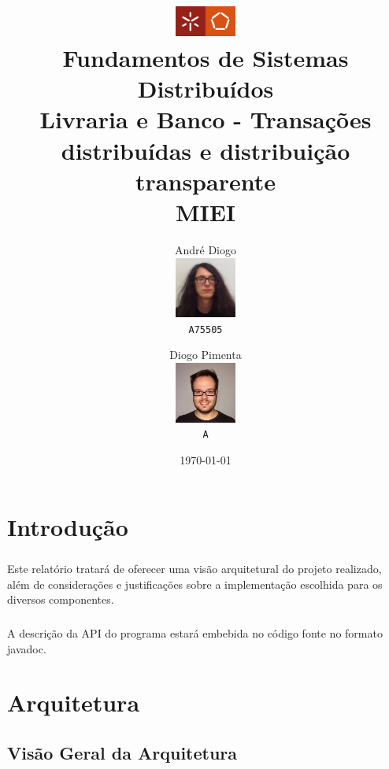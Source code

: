 \documentclass[11pt,a4paper]{report}
\title{\includegraphics[width=2cm]{logo-ee.png}\\
Fundamentos de Sistemas Distribuídos\\Livraria e Banco - Transações distribuídas e distribuição transparente\\MIEI}
\author{
  André Diogo\\
  \includegraphics[width=2cm]{c.jpeg}\\
  \texttt{A75505}
  \and
  Diogo Pimenta\\
  \includegraphics[width=2cm]{b.jpg}\\
  \texttt{A}
}
\date{\today}
\begin{document}
\maketitle

\newpage

\tableofcontents

\chapter{Introdução}

\paragraph{}Este relatório tratará de oferecer uma visão arquitetural do projeto realizado, além de considerações e justificações sobre a implementação escolhida para os diversos componentes.
\paragraph{}A descrição da API do programa estará embebida no código fonte no formato javadoc.

\chapter{Arquitetura}

\section{Visão Geral da Arquitetura}

%
\newpage
\end{document}

